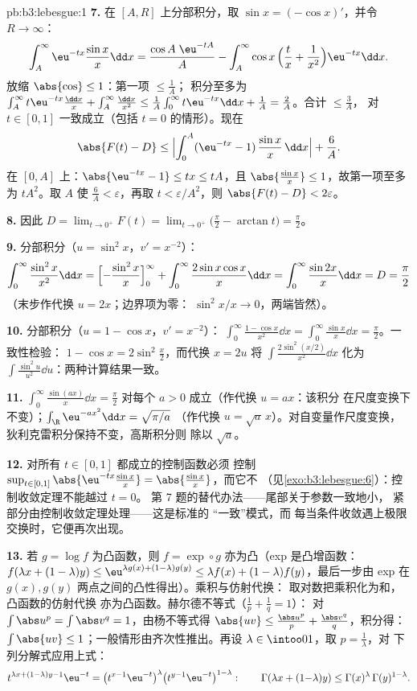 \begin{solution}{pb:b3:lebesgue:1}
\textbf{7.} 在 $[A, R]$ 上分部积分，取 $\sin x =
(-\cos x)'$，并令 $R \to \infty$：
\[
\int_A^{\infty}\eu^{-tx}\frac{\sin x}x\dd x
= \frac{\cos A\;\eu^{-tA}}{A}
- \int_A^\infty \cos x\,\Bigl(\frac tx +
\frac1{x^2}\Bigr)\eu^{-tx}\dd x .
\]
放缩 $\abs{\cos} \leq 1$：第一项 $\leq \frac1A$；
积分至多为 $\int_A^\infty t\eu^{-tx}\frac{\dd x}x
+ \int_A^\infty\frac{\dd x}{x^2} \leq \frac1A\int_0^\infty
t\eu^{-tx}\dd x + \frac1A = \frac2A$。合计 $\leq \frac 3A$，
对 $t \in [0, 1]$ 一致成立（包括 $t = 0$ 的情形）。现在
\[
\abs{F(t) - D} \leq
\Bigl|\int_0^A(\eu^{-tx} - 1)\,\frac{\sin x}x\,\dd x\Bigr| +
\frac6A .
\]
在 $[0, A]$ 上：$\abs{\eu^{-tx} - 1} \leq tx \leq tA$，且
$\abs{\frac{\sin x}x} \leq 1$，故第一项至多为
$tA^2$。取 $A$ 使 $\frac6A < \varepsilon$，再取 $t <
\varepsilon/A^2$，则 $\abs{F(t) - D} < 2\varepsilon$。

\textbf{8.} 因此 $D = \lim_{t\to0^+}F(t) =
\lim_{t\to0^+}\bigl(\frac\pi2 - \arctan t\bigr) =
\frac\pi2$。

\textbf{9.} 分部积分（$u = \sin^2x$，$v' = x^{-2}$）：
\[
\int_0^\infty\frac{\sin^2x}{x^2}\dd x
= \Bigl[-\frac{\sin^2x}{x}\Bigr]_0^\infty +
\int_0^\infty\frac{2\sin x\cos x}{x}\dd x
= \int_0^\infty\frac{\sin 2x}{x}\dd x = D = \frac\pi2
\]
（末步作代换 $u = 2x$；边界项为零：
$\sin^2 x/x \to 0$，两端皆然）。

\textbf{10.} 分部积分（$u = 1 - \cos x$，$v' = x^{-2}$）：
$\int_0^\infty\frac{1 - \cos x}{x^2}\dd x =
\int_0^\infty\frac{\sin x}x\dd x = \frac\pi2$。一致性检验：
$1 - \cos x = 2\sin^2\frac x2$，而代换 $x = 2u$
将 $\int\frac{2\sin^2(x/2)}{x^2}\dd x$ 化为
$\int\frac{\sin^2u}{u^2}\dd u$：两种计算结果一致。

\textbf{11.} $\int_0^\infty\frac{\sin(ax)}x\dd x = \frac\pi2$
对每个 $a > 0$ 成立（作代换 $u = ax$：该积分
在尺度变换下不变）；$\int_\R\eu^{-ax^2}\dd x = \sqrt{\pi/a}$
（作代换 $u = \sqrt a\,x$）。对自变量作尺度变换，
狄利克雷积分保持不变，高斯积分则
除以 $\sqrt a$。

\textbf{12.} 对所有 $t \in [0,1]$ 都成立的控制函数必须
控制 $\sup_{t\in[0,1]}\abs{\eu^{-tx}\frac{\sin
x}x} = \abs{\frac{\sin x}x}$，而它不
（见\cref{exo:b3:lebesgue:6}）：控制收敛定理不能越过 $t = 0$。
第 7 题的替代办法——尾部关于参数一致地小，
紧部分由控制收敛定理处理——这是标准的
“一致”模式，而
每当条件收敛遇上极限交换时，它便再次出现。

\textbf{13.} 若 $g = \log f$ 为凸函数，则 $f = \exp\circ g$
亦为凸（exp 是凸增函数：$f(\lambda x + (1-\lambda)
y) \leq \eu^{\lambda g(x) + (1-\lambda)g(y)} \leq \lambda f(x)
+ (1-\lambda)f(y)$，最后一步由 exp 在
$g(x), g(y)$ 两点之间的凸性得出）。乘积与仿射代换：
取对数把乘积化为和，凸函数的仿射代换
亦为凸函数。赫尔德不等式（$\frac1p + \frac1q = 1$）：
对 $\int\abs u^p = \int\abs v^q = 1$，由杨不等式得 $\abs{uv} \leq
\frac{\abs u^p}p + \frac{\abs v^q}q$，积分得：$\int\abs{uv}
\leq 1$；一般情形由齐次性推出。再设 $\lambda
\in \intoo01$，取 $p = \frac1\lambda$，对
下列分解式应用上式：
\[
t^{\lambda x + (1-\lambda)y - 1}\eu^{-t}
= \bigl(t^{x-1}\eu^{-t}\bigr)^{\lambda}
\bigl(t^{y-1}\eu^{-t}\bigr)^{1-\lambda} :
\qquad
\Gamma(\lambda x + (1{-}\lambda)y) \leq
\Gamma(x)^\lambda\,\Gamma(y)^{1-\lambda} .
\]


\end{solution}
